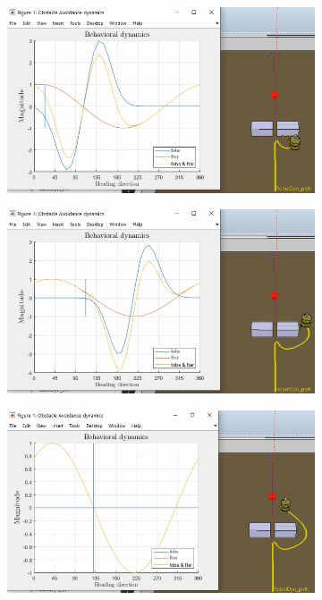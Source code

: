 \begin{figure}[htb!]
\begin{subfigure}{.45\textwidth}
    \caption{}%
    \label{fig:obs-tar-nonlinear-behavioral-10-3}
    \end{subfigure}
%
    \begin{subfigure}{.45\textwidth}
      \includegraphics[width=\textwidth]{img/3-2-3-4.PNG}
    \caption{}%
    \label{fig:obs-tar-nonlinear-behavioral-10-4}
    \end{subfigure}
%
    \begin{subfigure}{.45\textwidth}
      \includegraphics[width=\textwidth]{img/3-2-3-6.PNG}
    \caption{}%
    \label{fig:obs-tar-nonlinear-behavioral-10-5}
    \end{subfigure}
    \begin{subfigure}{.45\textwidth}
      \includegraphics[width=\textwidth]{img/3-2-3-7.PNG}

\end{subfigure}
\end{figure}
